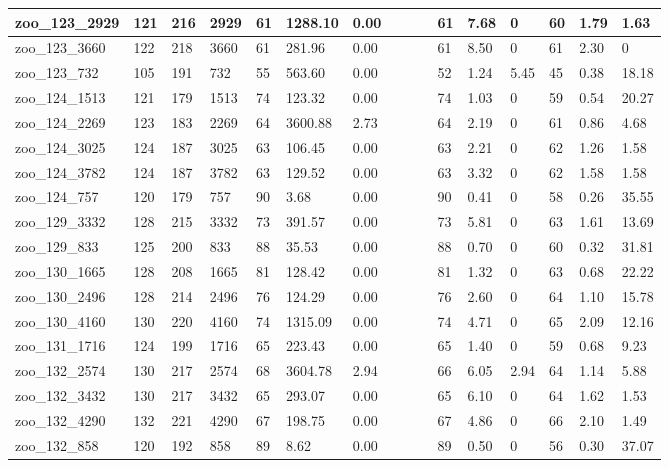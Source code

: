 \begin{landscape}
\begin{longtable}{llllllllllllllll}
zoo\_123\_2929 & 121 & 216 & 2929 & 61 & 1288.10 & 0.00 &  &  &  & 61 & 7.68 & 0 & 60 & 1.79 & 1.63 \\ \hline 
zoo\_123\_3660 & 122 & 218 & 3660 & 61 & 281.96 & 0.00 &  &  &  & 61 & 8.50 & 0 & 61 & 2.30 & 0 \\ \hline 
zoo\_123\_732 & 105 & 191 & 732 & 55 & 563.60 & 0.00 &  &  &  & 52 & 1.24 & 5.45 & 45 & 0.38 & 18.18 \\ \hline 
zoo\_124\_1513 & 121 & 179 & 1513 & 74 & 123.32 & 0.00 &  &  &  & 74 & 1.03 & 0 & 59 & 0.54 & 20.27 \\ \hline 
zoo\_124\_2269 & 123 & 183 & 2269 & 64 & 3600.88 & 2.73 &  &  &  & 64 & 2.19 & 0 & 61 & 0.86 & 4.68 \\ \hline 
zoo\_124\_3025 & 124 & 187 & 3025 & 63 & 106.45 & 0.00 &  &  &  & 63 & 2.21 & 0 & 62 & 1.26 & 1.58 \\ \hline 
zoo\_124\_3782 & 124 & 187 & 3782 & 63 & 129.52 & 0.00 &  &  &  & 63 & 3.32 & 0 & 62 & 1.58 & 1.58 \\ \hline 
zoo\_124\_757 & 120 & 179 & 757 & 90 & 3.68 & 0.00 &  &  &  & 90 & 0.41 & 0 & 58 & 0.26 & 35.55 \\ \hline 
zoo\_129\_3332 & 128 & 215 & 3332 & 73 & 391.57 & 0.00 &  &  &  & 73 & 5.81 & 0 & 63 & 1.61 & 13.69 \\ \hline 
zoo\_129\_833 & 125 & 200 & 833 & 88 & 35.53 & 0.00 &  &  &  & 88 & 0.70 & 0 & 60 & 0.32 & 31.81 \\ \hline 
zoo\_130\_1665 & 128 & 208 & 1665 & 81 & 128.42 & 0.00 &  &  &  & 81 & 1.32 & 0 & 63 & 0.68 & 22.22 \\ \hline 
zoo\_130\_2496 & 128 & 214 & 2496 & 76 & 124.29 & 0.00 &  &  &  & 76 & 2.60 & 0 & 64 & 1.10 & 15.78 \\ \hline 
zoo\_130\_4160 & 130 & 220 & 4160 & 74 & 1315.09 & 0.00 &  &  &  & 74 & 4.71 & 0 & 65 & 2.09 & 12.16 \\ \hline 
zoo\_131\_1716 & 124 & 199 & 1716 & 65 & 223.43 & 0.00 &  &  &  & 65 & 1.40 & 0 & 59 & 0.68 & 9.23 \\ \hline 
zoo\_132\_2574 & 130 & 217 & 2574 & 68 & 3604.78 & 2.94 &  &  &  & 66 & 6.05 & 2.94 & 64 & 1.14 & 5.88 \\ \hline 
zoo\_132\_3432 & 130 & 217 & 3432 & 65 & 293.07 & 0.00 &  &  &  & 65 & 6.10 & 0 & 64 & 1.62 & 1.53 \\ \hline 
zoo\_132\_4290 & 132 & 221 & 4290 & 67 & 198.75 & 0.00 &  &  &  & 67 & 4.86 & 0 & 66 & 2.10 & 1.49 \\ \hline 
zoo\_132\_858 & 120 & 192 & 858 & 89 & 8.62 & 0.00 &  &  &  & 89 & 0.50 & 0 & 56 & 0.30 & 37.07 \\ \hline 

\end{longtable}
\end{landscape}

